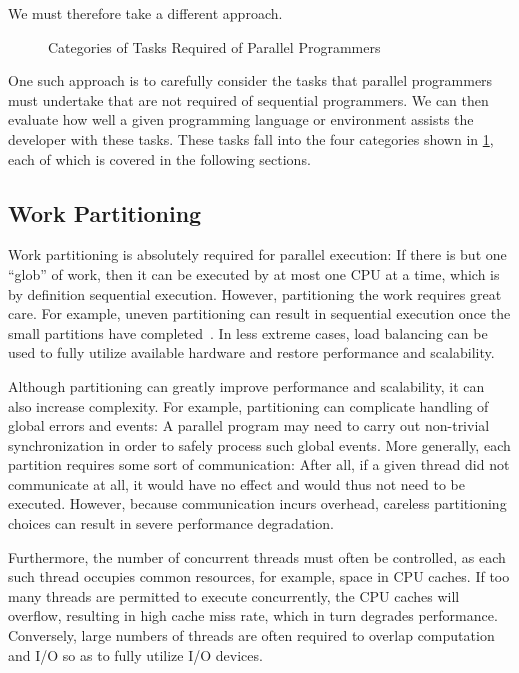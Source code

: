 We must therefore take a different approach.

\begin{figure}
\centering
{}
\caption{Categories of Tasks Required of Parallel Programmers}
\label{fig:intro:Categories of Tasks Required of Parallel Programmers}
\end{figure}

One such approach is to carefully consider the tasks that parallel
programmers must undertake that are not required of sequential programmers.
We can then evaluate how well a given programming language or environment
assists the developer with these tasks.
These tasks fall into the four categories shown in
\cref{fig:intro:Categories of Tasks Required of Parallel Programmers},
each of which is covered in the following sections.

\subsection{Work Partitioning}
\label{sec:intro:Work Partitioning}

Work partitioning is absolutely required for parallel execution:
If there is but one ``glob'' of work, then it can be executed by at
most one CPU at a time, which is by definition sequential execution.
However, partitioning the work requires great care.
For example, uneven partitioning can result in sequential execution
once the small partitions have completed~\cite{GeneAmdahl1967AmdahlsLaw}.
In less extreme cases, load balancing can be used to fully utilize
available hardware and restore performance and scalability.

Although partitioning can greatly improve performance and scalability,
it can also increase complexity.
For example, partitioning can complicate handling of global
errors and events:
A parallel program may need to carry out non-trivial synchronization
in order to safely process such global events.
More generally, each partition requires some sort of communication:
After all, if
a given thread did not communicate at all, it would have no effect and
would thus not need to be executed.
However, because communication incurs overhead, careless partitioning choices
can result in severe performance degradation.

Furthermore, the number of concurrent threads must often be controlled,
as each such thread occupies common resources, for example,
space in CPU caches.
If too many threads are permitted to execute concurrently, the
CPU caches will overflow, resulting in high cache miss rate, which in
turn degrades performance.
Conversely, large numbers of threads are often required to
overlap computation and I/O so as to fully utilize I/O devices.

